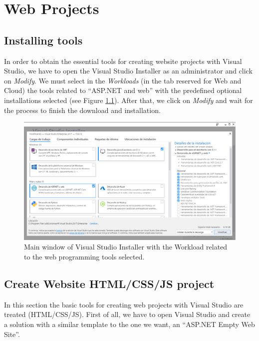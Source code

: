 \chapter{Web Projects}


    \FloatBarrier
    \section{Installing tools}
    
In order to obtain the essential tools for creating website projects with Visual Studio, we have to open the Visual Studio Installer as an administrator and click on \textit{Modify}. We must select in the \textit{Workloads} (in the tab reserved for Web and Cloud) the tools related to ``ASP.NET and web'' with the predefined optional installations selected (see Figure \ref{fig:pro1}). After that, we click on \textit{Modify} and wait for the process to finish the download and installation.

\begin{figure}
    \centering
    \includegraphics[width= \textwidth]{Figures/Projects/pro1}
    \caption{Main window of Visual Studio Installer with the Workload related to the web programming tools selected.}
    \label{fig:pro1}
\end{figure}




    \FloatBarrier
    \section{Create Website HTML/CSS/JS project}
    
In this section the basic tools for creating web projects with Visual Studio are treated (HTML/CSS/JS). First of all, we have to open Visual Studio and create a solution with a similar template to the one we want, an ``ASP.NET Empty Web Site''. 

